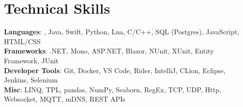 \section{Technical Skills}
 \begin{itemize}[leftmargin=0.15in, label={}]
    \small{\item{
     \textbf{Languages}{: \csharp, Java, Swift, Python, Lua, C/C++, SQL (Postgres), JavaScript, HTML/CSS} \\
     \textbf{Frameworks}{: .NET, Mono, ASP.NET, Blazor, NUnit, XUnit, Entity Framework, JUnit} \\
     \textbf{Developer Tools}{: Git, Docker, VS Code, Rider, IntelliJ, CLion, Eclipse, Jenkins, Selenium} \\
     \textbf{Misc}{: LINQ, TPL, pandas, NumPy, Seaborn, RegEx, TCP, UDP, Http, Websocket, MQTT, mDNS, REST APIs}
    }}
\end{itemize}